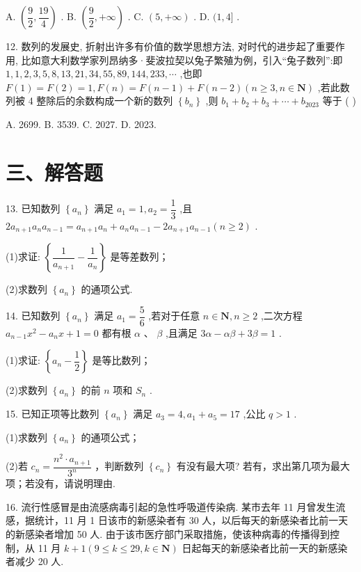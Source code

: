 A. $\left( {\dfrac{9}{2},\dfrac{19}{4}}\right)$ . B. $\left( {\dfrac{9}{2}, + \infty }\right)$ . C. $\left( {5, + \infty }\right)$ . D. $(1,4\rbrack$ .

12. 数列的发展史, 折射出许多有价值的数学思想方法, 对时代的进步起了重要作用, 比如意大利数学家列昂纳多·斐波拉契以兔子繁殖为例，引入“兔子数列”:即 $1,1,2,3,5,8,{13},{21},{34},{55},{89},{144},{233},\cdots$ ,也即 $F\left( 1\right)  = F\left( 2\right)  = 1,F\left( n\right)  = F\left( {n - 1}\right)  + F\left( {n - 2}\right) \left( {n \geq  3,n \in  \mathbf{N}}\right)$ ,若此数列被 4 整除后的余数构成一个新的数列 $\left\{  {b}_{n}\right\}$ ,则 ${b}_{1} + {b}_{2} + {b}_{3} + \cdots  + {b}_{2023}$ 等于 ( )

A. 2699. B. 3539. C. 2027. D. 2023.

\section*{三、解答题}

13. 已知数列 $\left\{  {a}_{n}\right\}$ 满足 ${a}_{1} = 1,{a}_{2} = \dfrac{1}{3}$ ,且 $2{a}_{n + 1}{a}_{n}{a}_{n - 1} = {a}_{n + 1}{a}_{n} + {a}_{n}{a}_{n - 1} - 2{a}_{n + 1}{a}_{n - 1}\left( {n \geq  2}\right)$ .

(1)求证: $\left\{  {\dfrac{1}{{a}_{n + 1}} - \dfrac{1}{{a}_{n}}}\right\}$ 是等差数列；

(2)求数列 $\left\{  {a}_{n}\right\}$ 的通项公式.

14. 已知数列 $\left\{  {a}_{n}\right\}$ 满足 ${a}_{1} = \dfrac{5}{6}$ ,若对于任意 $n \in  \mathbf{N},n \geq  2$ ,二次方程 ${a}_{n - 1}{x}^{2} - {a}_{n}x + 1 = 0$ 都有根 $\alpha$ 、 $\beta$ ,且满足 ${3\alpha } - {\alpha \beta } + {3\beta } = 1$ .

(1)求证: $\left\{  {{a}_{n} - \dfrac{1}{2}}\right\}$ 是等比数列；

(2)求数列 $\left\{  {a}_{n}\right\}$ 的前 $n$ 项和 ${S}_{n}$ .

15. 已知正项等比数列 $\left\{  {a}_{n}\right\}$ 满足 ${a}_{3} = 4,{a}_{1} + {a}_{5} = {17}$ ,公比 $q > 1$ .

(1)求数列 $\left\{  {a}_{n}\right\}$ 的通项公式；

(2)若 ${c}_{n} = \dfrac{{n}^{2} \cdot  {a}_{n + 1}}{{3}^{n}}$ ，判断数列 $\left\{  {c}_{n}\right\}$ 有没有最大项? 若有，求出第几项为最大项；若没有，请说明理由.

16. 流行性感冒是由流感病毒引起的急性呼吸道传染病. 某市去年 11 月曾发生流感，据统计，11 月 1 日该市的新感染者有 30 人，以后每天的新感染者比前一天的新感染者增加 50 人. 由于该市医疗部门采取措施，使该种病毒的传播得到控制，从 11 月 $k + 1\left( {9 \leq  k \leq  {29},k \in  \mathbf{N}}\right)$ 日起每天的新感染者比前一天的新感染者减少 20 人.

